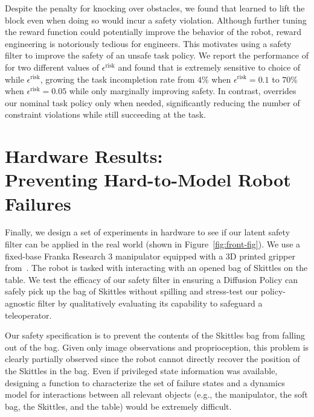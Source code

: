 Despite the penalty for knocking over obstacles, we found that \dreamer learned to lift the block even when doing so would incur a safety violation. Although further tuning the reward function could potentially improve the behavior of the robot, reward engineering is notoriously tedious for engineers. This motivates using a safety filter to improve the safety of an unsafe task policy. We report the performance of \cmdp for two different values of $\epsilon^\textrm{risk}$ and found that \cmdp is extremely sensitive to choice of while $\epsilon^\textrm{risk}$, growing the task incompletion rate from $4\%$ when $\epsilon^\textrm{risk} = 0.1$ to $70\%$ when $\epsilon^\textrm{risk} = 0.05$ while only marginally improving safety. In contrast, \ours overrides our nominal task policy only when needed, significantly reducing the number of constraint violations while still succeeding at the task.











\section{Hardware Results: \\ Preventing Hard-to-Model Robot Failures}
\label{sec:hardware}
Finally, we design a set of experiments in hardware to see if our latent safety filter can be applied in the real world (shown in Figure~\ref{fig:front-fig}). 
We use a fixed-base Franka Research 3 manipulator equipped with a 3D printed gripper from~\citep{chi2024universal}. 
The robot is tasked with interacting with an opened bag of Skittles on the table. 
We test the efficacy of our safety filter in ensuring a Diffusion Policy \cite{chi2024diffusionpolicy} can safely pick up the bag of Skittles without spilling and stress-test our policy-agnostic filter by qualitatively evaluating its capability to safeguard a teleoperator.


 Our safety specification is to prevent the contents of the Skittles bag from falling out of the bag. 
Given only image observations and proprioception, this problem is clearly partially observed since the robot cannot directly recover the position of the Skittles in the bag.
Even if privileged state information was available, designing a function to characterize the set of failure states and a dynamics model for interactions between all relevant objects (e.g., the manipulator, the soft bag, the Skittles, and the table) would be extremely difficult. 

